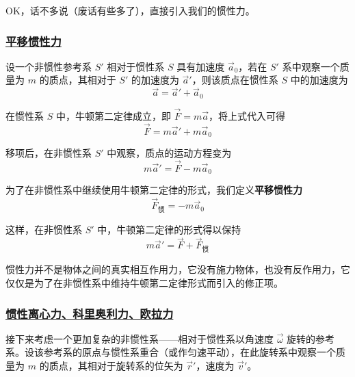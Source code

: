 OK，话不多说（废话有些多了），直接引入我们的惯性力。

\subsubsection{\protect\hyperlink{:}{平移惯性力}}

设一个非惯性参考系 $S'$ 相对于惯性系 $S$ 具有加速度 $\vec{a}_0$，若在 $S'$ 系中观察一个质量为 $m$ 的质点，其相对于 $S'$ 的加速度为 $\vec{a}'$，则该质点在惯性系 $S$ 中的加速度为
\begin{equation}
    \vec{a} = \vec{a}' + \vec{a}_0
\end{equation}

在惯性系 $S$ 中，牛顿第二定律成立，即 $\vec{F} = m\vec{a}$，将上式代入可得
\begin{equation}
    \vec{F} = m\vec{a}' + m\vec{a}_0
\end{equation}

移项后，在非惯性系 $S'$ 中观察，质点的运动方程变为
\begin{equation}
    m\vec{a}' = \vec{F} - m\vec{a}_0
\end{equation}

为了在非惯性系中继续使用牛顿第二定律的形式，我们定义\textbf{平移惯性力}
\begin{equation}
    \vec{F}_{\text{惯}} = -m\vec{a}_0
\end{equation}

这样，在非惯性系 $S'$ 中，牛顿第二定律的形式得以保持
\begin{equation}
    m\vec{a}' = \vec{F} + \vec{F}_{\text{惯}}
\end{equation}

\begin{remark}
    惯性力并不是物体之间的真实相互作用力，它没有施力物体，也没有反作用力，它仅仅是为了在非惯性系中维持牛顿第二定律形式而引入的修正项。
\end{remark}

\subsubsection{\protect\hyperlink{:}{惯性离心力、科里奥利力、欧拉力}}

接下来考虑一个更加复杂的非惯性系——相对于惯性系以角速度 $\vec{\omega}$ 旋转的参考系。设该参考系的原点与惯性系重合（或作匀速平动），在此旋转系中观察一个质量为 $m$ 的质点，其相对于旋转系的位矢为 $\vec{r}'$，速度为 $\vec{v}'$。

